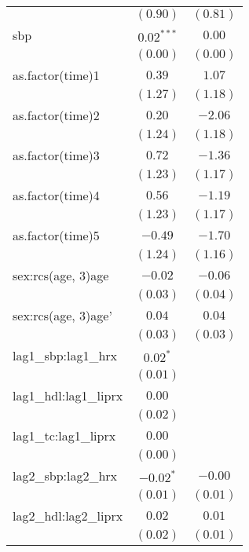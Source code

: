 \begin{tabular}{l c c}
                      & $(0.90)$      & $(0.81)$      \\
sbp                   & $0.02^{***}$  & $0.00$        \\
                      & $(0.00)$      & $(0.00)$      \\
as.factor(time)1      & $0.39$        & $1.07$        \\
                      & $(1.27)$      & $(1.18)$      \\
as.factor(time)2      & $0.20$        & $-2.06$       \\
                      & $(1.24)$      & $(1.18)$      \\
as.factor(time)3      & $0.72$        & $-1.36$       \\
                      & $(1.23)$      & $(1.17)$      \\
as.factor(time)4      & $0.56$        & $-1.19$       \\
                      & $(1.23)$      & $(1.17)$      \\
as.factor(time)5      & $-0.49$       & $-1.70$       \\
                      & $(1.24)$      & $(1.16)$      \\
sex:rcs(age, 3)age    & $-0.02$       & $-0.06$       \\
                      & $(0.03)$      & $(0.04)$      \\
sex:rcs(age, 3)age'   & $0.04$        & $0.04$        \\
                      & $(0.03)$      & $(0.03)$      \\
lag1\_sbp:lag1\_hrx   & $0.02^{*}$    &               \\
                      & $(0.01)$      &               \\
lag1\_hdl:lag1\_liprx & $0.00$        &               \\
                      & $(0.02)$      &               \\
lag1\_tc:lag1\_liprx  & $0.00$        &               \\
                      & $(0.00)$      &               \\
lag2\_sbp:lag2\_hrx   & $-0.02^{*}$   & $-0.00$       \\
                      & $(0.01)$      & $(0.01)$      \\
lag2\_hdl:lag2\_liprx & $0.02$        & $0.01$        \\
                      & $(0.02)$      & $(0.01)$      \\

\end{tabular}
